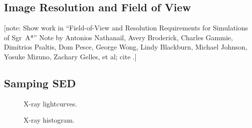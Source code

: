 \documentclass[twocolumn,tighten,dvipsnames,linenumbers]{aastex63}
\newcommand\note[1]{{\color{OliveGreen}[note: #1]}}
\begin{document}
\subsection{Image Resolution and Field of View}
\label{sec:res-FoV}

\note{Show work in ``Field-of-View and Resolution Requirements for
  Simulations of Sgr~A*'' Note by Antonios Nathanail, Avery Broderick,
  Charles Gammie, Dimitrios Psaltis, Dom Pesce, George Wong, Lindy
  Blackburn, Michael Johnson, Yosuke Mizuno, Zachary Gelles, et al;
  cite \citet{2020arXiv200406210P}.}

\subsection{Samping SED}
\label{sec:sed-sample}

\begin{figure}
  \caption{X-ray lightcurves.}
  \label{fig:lc}
\end{figure}

\begin{figure}
  \caption{X-ray histogram.}
  \label{fig:hist}
\end{figure}






\end{document}
